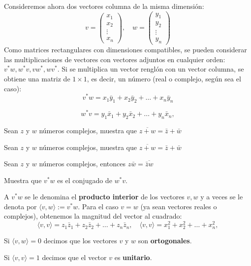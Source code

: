 Consideremos ahora dos vectores columna de la misma dimensión:
$$
v=
\left(\begin{array}{c}
    x_{1}\\
    x_{2}\\
    \vdots \\
    x_{n}
\end{array} \right)
,\quad
w=
\left(\begin{array}{c}
    y_{1}\\
    y_{2}\\
    \vdots \\
    y_{n}
\end{array} \right)
$$
Como matrices rectangulares con dimensiones compatibles, se pueden considerar las multiplicaciones de vectores con vectores adjuntos en cualquier orden: $v^*w, w^*v, vw^*,wv^*$. Si se multiplica un vector renglón con un vector columna, se obtiene una matriz de $1\times 1$, es decir, un número (real o complejo, según sea el caso):
$$v^*w=x_{1}\bar y_{1}+x_{2}\bar y_{2}+\dots +x_{n}\bar y_{n}$$

$$w^*v=y_{1}\bar x_{1}+y_{2}\bar x_{2}+\dots +y_{n}\bar x_{n},$$

\begin{ejercicio}
Sean $z$ y $w$ números complejos, muestra que $\overline {z+w}=\bar z+ \bar w$
\end{ejercicio}

\begin{ejercicio}
Sean $z$ y $w$ números complejos, muestra que $\overline {z+w}=\bar z+ \bar w$
\end{ejercicio}

\begin{ejercicio}
Sean $z$ y $w$ números complejos, entonces $z\bar w=\overline{\bar z w}$
\end{ejercicio}

\begin{ejercicio}
Muestra que $v^*w$ es el conjugado de $w^*v$.
\end{ejercicio}

A $v^*w$ se le denomina el {\bf producto interior} de los vectores $v,w$ y a veces se le denota por $\langle v,w\rangle:=v^*w$. Para el caso $v=w$ (ya sean vectores reales o complejos), obtenemos la magnitud del vector al cuadrado:
$$\langle v,v\rangle=z_1\bar z_1+z_2\bar z_2+ \dots +z_n\bar z_n, \quad \langle v,v\rangle=x_1^2+x_2^2+ \dots+ x_n^2, $$

\begin{definicion}
Si $\langle v,w\rangle=0$ decimos que los vectores $v$ y $w$ son {\bf ortogonales}.

Si $\langle v,v\rangle=1$ decimos que el vector $v$ es {\bf unitario}.
\end{definicion}

